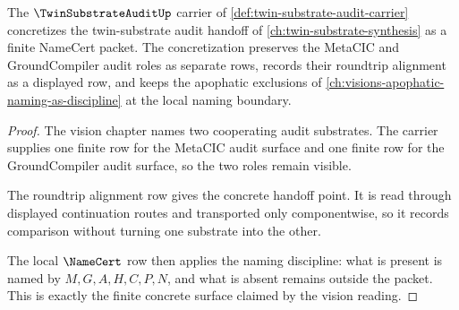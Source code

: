 \begin{theorem}
\label{thm:twin-substrate-audit-vision-concretization}
The $\TwinSubstrateAuditUp$ carrier of \autoref{def:twin-substrate-audit-carrier} concretizes the twin-substrate audit handoff of \autoref{ch:twin-substrate-synthesis} as a finite NameCert packet. The concretization preserves the MetaCIC and GroundCompiler audit roles as separate rows, records their roundtrip alignment as a displayed row, and keeps the apophatic exclusions of \autoref{ch:visions-apophatic-naming-as-discipline} at the local naming boundary.
\end{theorem}
\begin{proof}
The vision chapter names two cooperating audit substrates. The carrier supplies one finite row for the MetaCIC audit surface and one finite row for the GroundCompiler audit surface, so the two roles remain visible.

The roundtrip alignment row gives the concrete handoff point. It is read through displayed continuation routes and transported only componentwise, so it records comparison without turning one substrate into the other.

The local $\NameCert$ row then applies the naming discipline: what is present is named by $M,G,A,H,C,P,N$, and what is absent remains outside the packet. This is exactly the finite concrete surface claimed by the vision reading.
\end{proof}


\begin{closurestatus}{\TwinSubstrateAuditUp}
  \theoryclosure{\seedClosure}
  \formalstatus{\unformalizedV}
\end{closurestatus}
